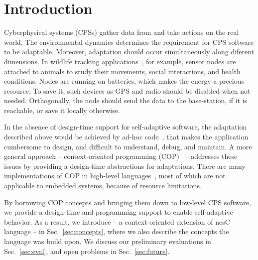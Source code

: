 \section{Introduction}

Cyberphysical systems (CPSs) gather data from and take actions on the real
world. The environmental dynamics determines the requirement for CPS software to
be adaptable. Moreover, adaptation should occur simultaneously along diferent
dimensions. In wildlife tracking applications~\cite{pasztor10:selective}, for
example, sensor nodes are attached to animals to study their movements, social
interactions, and health conditions. Nodes are running on batteries, which makes
the energy a precious resource. To save it, such devices as GPS and radio should
be disabled when not needed. Orthogonally, the node should send the data to the
base-station, if it is reachable, or save it locally otherwise.

In the absence of design-time support for self-adaptive software, the adaptation
described above would be achieved by ad-hoc
code~\cite{Zimmerling12,Bourdenas11}, that makes the application cumbersome to
design, and difficult to understand, debug, and maintain. A more general
approach -- context-oriented programming (COP)~\cite{Hirschfeld08} -- addresses
these issues by providing a design-time abstractions for adaptations. There are
many implementations of COP in high-level
languages~\cite{Ghezzi10,Salvaneschi12,Sehic11}, most of which are not
applicable to embedded systems, because of resource limitations.


By borrowing COP concepts and bringing them down to low-level CPS software, we
provide a design-time and programming support to enable self-adaptive behavior.
As a result, we introduce \conesc -- a context-oriented extension of nesC
language -- in Sec.~\ref{sec:concepts}, where we also describe the concepts the
language was build upon. We discuss our preliminary evaluations in
Sec.~\ref{sec:eval}, and open problems in Sec.~\ref{sec:future}.

